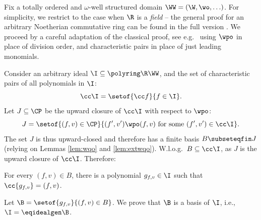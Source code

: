%


Fix a totally ordered and $\omega$-well structured domain $\WW = (\W, \wo, \ldots)$.
For simplicity, we restrict to the case when $\R$ is a \emph{field} --
the general proof for an arbitrary Noetherian commutative ring can be found in the full version
\cite{GL24-arxiv}. 
%
We proceed by a careful adaptation of the classical proof, see e.g.~\cite[Section 2.5]{Cox15}
using $\wpo$ in place of division order, and
characteristic pairs in place of just leading monomials.

Consider an arbitrary ideal $\I \subseteq \polyring \R \WW$, and the set of characteristic pairs
of all polynomials in $\I$:
\[
\cc \I = \setof{\cc f}{f\in\I}.
\]
Let $J\subseteq \CP$ be the upward closure of $\cc \I$ with respect to $\wpo$:
\[
J = \setof{(f,v)\in \CP}{(f',v')\wpo (f,v) \text{ for some } (f',v')\in \cc \I}.
\]
The set $J$ is thus upward-closed and therefore has a finite basis $B\subseteqfin J$
(relying on Lemmas \ref{lem:wqo}  and \ref{lem:extwqo}).
W.l.o.g.~$B\subseteq \cc \I$, as $J$ is the upward closure of $\cc \I$.
Therefore:
\begin{claim} \label{claim:fv}
 For every $(f,v)\in B$, there is a polynomial $g_{f,v}\in\I$  such that
$\cc {g_{f,v}} = (f,v)$.
\end{claim}
Let $\B = \setof{g_{f,v}}{(f,v)\in B}$.
We prove that $\B$ is a basis of $\I$, i.e., $\I = \eqidealgen \B$.

